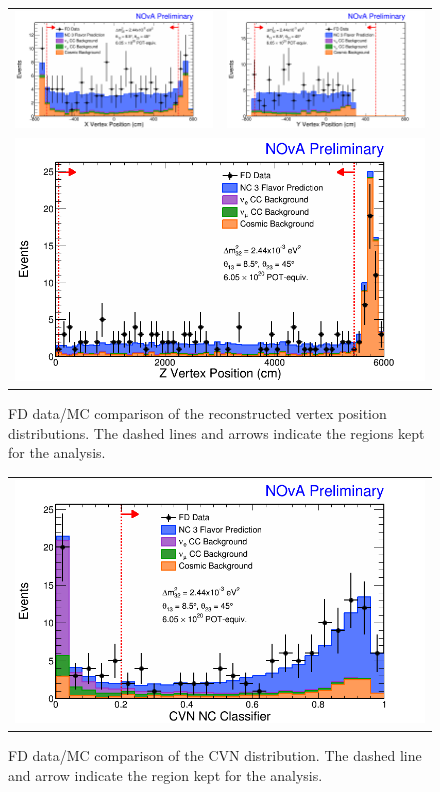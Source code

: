 \begin{figure}[htbp]
  \centering
  \begin{tabular}{c c}
    \includegraphics[width=.48\textwidth]{figures/FDDataMC/FDVtxXStack.png} &
    \includegraphics[width=.48\textwidth]{figures/FDDataMC/FDVtxYStack.png} \\
    \multicolumn{2}{c}{\includegraphics[width=.48\textwidth]{figures/FDDataMC/FDVtxZStack.png}} \\
  \end{tabular}
  \caption[FD Data/MC Comparison: Fiducial Variable Distributions]{FD data/MC comparison of the reconstructed vertex position distributions. The dashed lines and arrows indicate the regions kept for the analysis.}
  \label{fig:FDDataMCFidCont}
\end{figure}

\begin{figure}[htbp]
  \centering
  \begin{tabular}{c c}
    \multicolumn{2}{c}{\includegraphics[width=.48\textwidth]{figures/FDDataMC/FDCVNStack.png}} \\
  \end{tabular}
  \caption[FD Data/MC Comparison: CVN Distribution]{FD data/MC comparison of the CVN distribution. The dashed line and arrow indicate the region kept for the analysis.}
  \label{fig:FDDataMCNCSel}
\end{figure}

